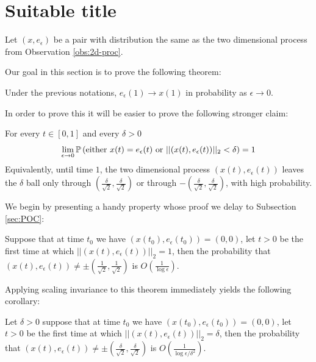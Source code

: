 {
\newcommand{\eeps}{e_\epsilon}

\section{Suitable title}
Let $(x, \eeps)$ be a pair with distribution the same as the two
dimensional process from Observation \ref{obs:2d-proc}.

Our goal in this section is to prove the following theorem:
\begin{theorem}\label{thm:main1}
Under the previous notations, $\eeps(1) \to x(1)$ in probability
as $\epsilon \to 0$.
\end{theorem}

\newcommand{\radiussq}{\delta^2}
\newcommand{\radius}{\delta}
\newcommand{\twonorm}[1]{||#1||_2}

\newcommand{\twodproc}[1]{(x(#1), \eeps(#1))}

In order to prove this it will be easier to prove the following
stronger claim:
\begin{propos}\label{thm:main2}
For every $t\in[0,1]$ and every $\radius>0$
$$\ds \lim_{\epsilon \rightarrow 0}\P\left(\text{either } x(t)=\eeps(t)
\text{ or } \twonorm{\twodproc{t}} <\radius\right)=1$$
Equivalently, until time $1$, the two dimensional process $\twodproc{t}$
leaves the $\radius$ ball only through $(\frac{\radius}{\sqrt2},\frac{\radius}{\sqrt2})$ or through $-(\frac{\radius}{\sqrt2},\frac{\radius}{\sqrt2})$, with high probability.
\end{propos}

We begin by presenting a handy property whose proof
we delay to Subsection \ref{sec:POC}:

\begin{propos}\label{thm:no-escape}
Suppose that at time $t_0$ we have
$\twodproc{t_0}=(0,0)$, let $t>0$ be the first time at which
$\twonorm{\twodproc{t}}=1$, then the probability
that $\twodproc{t} \not=\pm(\frac{1}{\sqrt2},\frac{1}{\sqrt2})$ is $O(\frac1{\log\epsilon})$.
\end{propos}

Applying scaling invariance to this theorem immediately yields the
following corollary:
\begin{cor}\label{cor:cor1}
Let $\radius>0$ suppose that at time $t_0$ we have $\twodproc{t_0}=(0,0)$, let
$t>0$ be the first time at which
$\twonorm{\twodproc{t}} = \radius$, then the probability
that $\twodproc{t} \not=\pm(\frac{\radius}{\sqrt2},\frac{\radius}{\sqrt2})$ is
$O(\frac{1}{\log\epsilon/\radiussq})$.
\end{cor}

}
